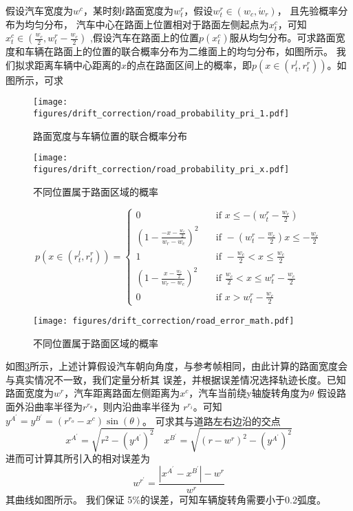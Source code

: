 假设汽车宽度为$w^c$，某时刻$t$路面宽度为$w^r_t$，假设$w^r_t\in (w_c,\acute{w}_r)$， 且先验概率分布为均匀分布，
汽车中心在路面上位置相对于路面左侧起点为$x^c_t$，可知$x^c_t \in \left(\frac{w_c}{2},w^r_t-\frac{w_c}{2}\right)$
,假设汽车在路面上的位置$p(x^c_t)$服从均匀分布。可求路面宽度和车辆在路面上的位置的联合概率分布为二维面上的均匀分布，如图所示。
我们拟求距离车辆中心距离的$x$的点在路面区间上的概率，即$p(x\in (r_t^l,r_t^r))$。如图所示，可求
\begin{figure}[h]
    \centering
    \texttt{[image: figures/drift\_correction/road\_probability\_pri\_1.pdf]}
    \caption{路面宽度与车辆位置的联合概率分布}
    \label{fig:road_prob}
\end{figure}
\begin{figure}[h]
    \centering
    \texttt{[image: figures/drift\_correction/road\_probability\_pri\_x.pdf]}
    \caption{不同位置属于路面区域的概率}
    \label{fig:road_prob}
\end{figure}
\begin{equation}
p(x\in (r_t^l,r_t^r))=
  \begin{cases}
    0      & \quad \text{if } x\leq-(w_t^r-\frac{w_c}{2})\\
    \left(1-\frac{-x-\frac{w_c}{2}}{w_r-w_c}\right)^2       & \quad \text{if } -(w_t^r-\frac{w_c}{2})x\leq-\frac{w_c}{2}\\
    1  & \quad \text{if } -\frac{w_c}{2}<x\leq\frac{w_c}{2}\\
    \left(1-\frac{x-\frac{w_c}{2}}{w_r-w_c}\right)^2 & \quad \text{if } \frac{w_c}{2}<x\leq w_t^r-\frac{w_c}{2}\\
    0 &\quad \text{if }  x>w_t^r-\frac{w_c}{2}
  \end{cases}
\end{equation}

\begin{figure}[h]
    \centering
    \texttt{[image: figures/drift\_correction/road\_error\_math.pdf]}
    \caption{不同位置属于路面区域的概率}
    \label{fig:dc_road_error_math}
\end{figure}

如图\ref{fig:dc_road_error_math}所示，上述计算假设汽车朝向角度，与参考帧相同，由此计算的路面宽度会与真实情况不一致，我们定量分析其
误差，并根据误差情况选择轨迹长度。已知路面宽度为$w^r$，汽车距离路面左侧距离为$x^c$，汽车当前绕y轴旋转角度为$\theta$
假设路面外沿曲率半径为$r^{r_o}$，则内沿曲率半径为
$r^{r_i}$。可知$y^{A^\prime}=y^{B^\prime}=(r^{r_o}-x^c)\sin(\theta)$。
可求其与道路左右边沿的交点
\begin{equation}
    x^{A^\prime}=\sqrt {r^2-(y^{A^\prime})^2} \quad x^{B^\prime}=\sqrt {(r-w^r)^2-(y^{A^\prime})^2}
\end{equation}
进而可计算其所引入的相对误差为
\begin{equation}
    w^{r^\prime} = \frac{|x^{A^\prime} -x^{B^\prime}|-w^r}{w^r}
\end{equation}
其曲线如图所示。 我们保证 5\%的误差，可知车辆旋转角需要小于0.2弧度。

